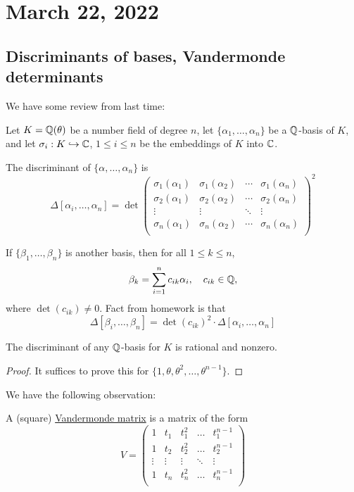 \section{March 22, 2022}
\subsection{Discriminants of bases, Vandermonde determinants}
We have some review from last time:

Let $K = \mathbb Q(\theta)$ be a number field of degree $n$, let $\{\alpha_1, \dots, \alpha_n\}$ be a $\mathbb Q$-basis of $K$, and let $\sigma_i : K\hookrightarrow \mathbb C$, $1\leq i\leq n$ be the embeddings of $K$ into $\mathbb C$.

The discriminant of $\{\alpha, \dots, \alpha_n\}$ is
\[\Delta[\alpha_i, \dots, \alpha_n] = \det\begin{pmatrix}
        \sigma_1(\alpha_1) & \sigma_1(\alpha_2) & \cdots & \sigma_1(\alpha_n) \\
        \sigma_2(\alpha_1) & \sigma_2(\alpha_2) & \cdots & \sigma_2(\alpha_n) \\
        \vdots             & \vdots             & \ddots & \vdots             \\
        \sigma_n(\alpha_1) & \sigma_n(\alpha_2) & \cdots & \sigma_n(\alpha_n) \\
    \end{pmatrix}^2\]

If $\{\beta_1, \dots, \beta_n\}$ is another basis, then for all $1\leq k\leq n$,
\[\beta_k = \sum_{i=1}^n c_{ik}\alpha_i, \quad c_{ik}\in \mathbb Q,\]
where $\det(c_{ik})\neq 0$. Fact from homework is that
\[\Delta[\beta_i, \dots, \beta_n] = \det(c_{ik})^2\cdot \Delta[\alpha_i, \dots, \alpha_n]\]

\begin{theorem*}
    The discriminant of any $\mathbb Q$-basis for $K$ is rational and nonzero.
\end{theorem*}
\begin{proof}
    It suffices to prove this for $\{1, \theta, \theta^2, \dots, \theta^{n-1}\}$.
\end{proof}

We have the following observation:
\begin{definition*}
    A (square) \ul{Vandermonde matrix} is a matrix of the form
    \[V = \begin{pmatrix}
            1      & t_1    & t_1^2  & \dots  & t_1^{n-1} \\
            1      & t_2    & t_2^2  & \dots  & t_2^{n-1} \\
            \vdots & \vdots & \vdots & \ddots & \vdots    \\
            1      & t_n    & t_n^2  & \dots  & t_n^{n-1} \\
        \end{pmatrix}\]
\end{definition*}

